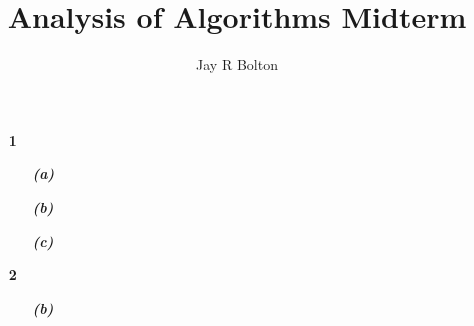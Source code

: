 \documentclass{article}
\title{Analysis of Algorithms Midterm}
\author{Jay R Bolton}
\begin{document}
\maketitle

\begin{enumerate}

\item[\textbf{1}]

	\begin{enumerate}

		\item[\textbf{\emph{{(a)}}}]

		\item[\textbf{\emph{{(b)}}}]

		\item[\textbf{\emph{{(c)}}}]

	\end{enumerate}

\item[\textbf{2}]

	\begin{enumerate}

		\item[\textbf{\emph{{(b)}}}]

	\end{enumerate}

\end{enumerate}
\end{document}
